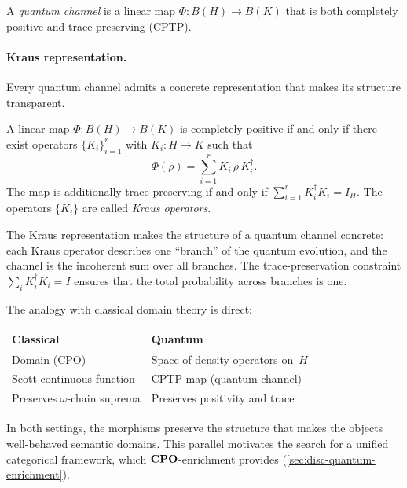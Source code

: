 \begin{definition}
\label{def:cptp-map}
A \emph{quantum channel} is a linear map
$\Phi : B(H) \to B(K)$ that is both completely positive and
trace-preserving (CPTP).
\end{definition}

\paragraph{Kraus representation.}
Every quantum channel admits a concrete representation that makes its
structure transparent.

\begin{theorem}
\label{thm:kraus}
A linear map $\Phi : B(H) \to B(K)$ is completely positive if and
only if there exist operators $\{K_i\}_{i=1}^r$ with
$K_i : H \to K$ such that
\[
  \Phi(\rho) = \sum_{i=1}^{r} K_i\,\rho\,K_i^\dagger.
\]
The map is additionally trace-preserving if and only if
$\sum_{i=1}^{r} K_i^\dagger K_i = I_H$.
The operators $\{K_i\}$ are called \emph{Kraus operators}.
\end{theorem}

\noindent
The Kraus representation makes the structure of a quantum channel
concrete: each Kraus operator describes one ``branch'' of the quantum
evolution, and the channel is the incoherent sum over all branches.
The trace-preservation constraint
$\sum_i K_i^\dagger K_i = I$ ensures that the total probability
across branches is one.

\begin{remark}
\label{rem:cptp-morphisms}
The analogy with classical domain theory is direct:
\begin{center}
\begin{tabular}{@{}l l@{}}
\toprule
\textbf{Classical} & \textbf{Quantum} \\
\midrule
Domain (CPO) & Space of density operators on~$H$ \\
Scott-continuous function & CPTP map (quantum channel) \\
Preserves $\omega$-chain suprema & Preserves positivity and trace \\
\bottomrule
\end{tabular}
\end{center}
\noindent
In both settings, the morphisms preserve the structure that makes the
objects well-behaved semantic domains.
This parallel motivates the search for a unified categorical framework,
which $\mathbf{CPO}$-enrichment provides
(\cref{sec:disc-quantum-enrichment}).
\end{remark}

